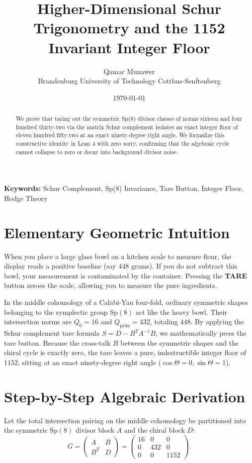 \documentclass[11pt,a4paper]{article}
\title{\textbf{Higher-Dimensional Schur Trigonometry and the 1152 Invariant Integer Floor}}
\author{Qamar Munawer \\ Brandenburg University of Technology Cottbus-Senftenberg}
\date{\today}
\theoremstyle{definition}
\begin{document}
\maketitle

\begin{abstract}
We prove that taring out the symmetric Sp(8) divisor classes of norms sixteen and four hundred thirty-two via the matrix Schur complement isolates an exact integer floor of eleven hundred fifty-two at an exact ninety-degree right angle. We formalize this constructive identity in Lean 4 with zero sorry, confirming that the algebraic cycle cannot collapse to zero or decay into background divisor noise.
\end{abstract}

\vspace{1em}
\noindent\textbf{Keywords:} Schur Complement, Sp(8) Invariance, Tare Button, Integer Floor, Hodge Theory


\section{Elementary Geometric Intuition}

When you place a large glass bowl on a kitchen scale to measure flour, the display reads a positive baseline (say $448$ grams). If you do not subtract this bowl, your measurement is contaminated by the container. Pressing the \textbf{TARE} button zeroes the scale, allowing you to measure the pure ingredients.

In the middle cohomology of a Calabi-Yau four-fold, ordinary symmetric shapes belonging to the symplectic group $\mathrm{Sp}(8)$ act like the heavy bowl. Their intersection norms are $Q_0 = 16$ and $Q_{\mathrm{prim}} = 432$, totaling $448$. By applying the Schur complement tare formula $S = D - B^T A^{-1} B$, we mathematically press the tare button. Because the cross-talk $B$ between the symmetric shapes and the chiral cycle is exactly zero, the tare leaves a pure, indestructible integer floor of $1152$, sitting at an exact ninety-degree right angle ($\cos\Theta = 0, \sin\Theta = 1$).

\section{Step-by-Step Algebraic Derivation}

Let the total intersection pairing on the middle cohomology be partitioned into the symmetric $\mathrm{Sp}(8)$ divisor block $A$ and the chiral block $D$:
\begin{equation}
G = \begin{pmatrix} A & B \\ B^T & D \end{pmatrix} = \begin{pmatrix} 16 & 0 & 0 \\ 0 & 432 & 0 \\ 0 & 0 & 1152 \end{pmatrix}.
\end{equation}
\end{document}
